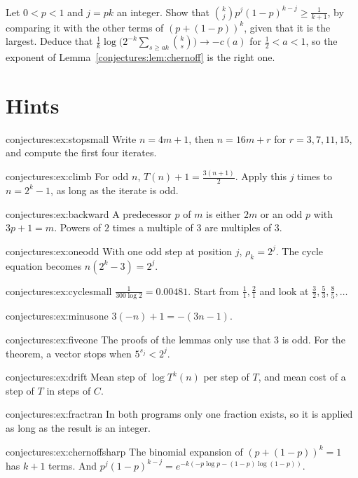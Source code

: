 \begin{exercise}[$\star\star$]\label{conjectures:ex:chernoffsharp}
Let $0<p<1$ and $j=pk$ an integer. Show that $\binom kjp^j(1-p)^{k-j}\ge\frac1{k+1}$, by comparing it with the other terms of $(p+(1-p))^k$, given that it is
the largest. Deduce that $\frac1k\log\bigl(2^{-k}\sum_{s\ge ak}\binom ks\bigr)\to-c(a)$ for $\frac12<a<1$, so the exponent of Lemma~\ref{conjectures:lem:chernoff} is
the right one.
\end{exercise}

\section{Hints}

\begin{hint}{conjectures:ex:stopsmall}
Write $n=4m+1$, then $n=16m+r$ for $r=3,7,11,15$, and compute the first four iterates.
\end{hint}
\begin{hint}{conjectures:ex:climb}
For odd $n$, $T(n)+1=\frac{3(n+1)}2$. Apply this $j$ times to $n=2^k-1$, as long as the iterate is odd.
\end{hint}
\begin{hint}{conjectures:ex:backward}
A predecessor $p$ of $m$ is either $2m$ or an odd $p$ with $3p+1=m$. Powers of $2$ times a multiple of $3$ are multiples of $3$.
\end{hint}
\begin{hint}{conjectures:ex:oneodd}
With one odd step at position $j$, $\rho_k=2^j$. The cycle equation becomes $n(2^k-3)=2^j$.
\end{hint}
\begin{hint}{conjectures:ex:cyclesmall}
$\frac1{300\log2}=0.00481$. Start from $\frac11,\frac21$ and look at $\frac32,\frac53,\frac85,\dots$
\end{hint}
\begin{hint}{conjectures:ex:minusone}
$3(-n)+1=-(3n-1)$.
\end{hint}
\begin{hint}{conjectures:ex:fiveone}
The proofs of the lemmas only use that $3$ is odd. For the theorem, a vector stops when $5^{s_j}<2^j$.
\end{hint}
\begin{hint}{conjectures:ex:drift}
Mean step of $\log T^k(n)$ per step of $T$, and mean cost of a step of $T$ in steps of $C$.
\end{hint}
\begin{hint}{conjectures:ex:fractran}
In both programs only one fraction exists, so it is applied as long as the result is an integer.
\end{hint}
\begin{hint}{conjectures:ex:chernoffsharp}
The binomial expansion of $(p+(1-p))^k=1$ has $k+1$ terms. And $p^j(1-p)^{k-j}=e^{-k(-p\log p-(1-p)\log(1-p))}$.
\end{hint}

